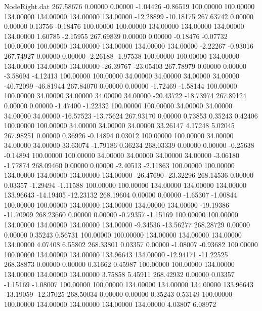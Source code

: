 \begin{filecontents}{NodeRight.dat}
 267.58676    0.00000    0.00000    -1.04426   -0.86519  100.00000  100.00000  134.00000  134.00000  134.00000  134.00000  -12.28899  -10.18175
 267.63742    0.00000    0.00000     0.13756   -0.18476  100.00000  100.00000  134.00000  134.00000  134.00000  134.00000    1.60785   -2.15955
 267.69839    0.00000    0.00000    -0.18476   -0.07732  100.00000  100.00000  134.00000  134.00000  134.00000  134.00000   -2.22267   -0.93016
 267.74927    0.00000    0.00000    -2.26188   -1.97538  100.00000  100.00000  134.00000  134.00000  134.00000  134.00000  -26.39767  -23.05403
 267.78979    0.00000    0.00000    -3.58694   -4.12413  100.00000  100.00000   34.00000   34.00000   34.00000   34.00000  -40.72099  -46.81944
 267.84070    0.00000    0.00000    -1.72469   -1.58144  100.00000  100.00000   34.00000   34.00000   34.00000   34.00000  -20.43722  -18.73974
 267.89124    0.00000    0.00000    -1.47400   -1.22332  100.00000  100.00000   34.00000   34.00000   34.00000   34.00000  -16.57523  -13.75624
 267.93170    0.00000    0.73853     0.35243    0.42406  100.00000  100.00000   34.00000   34.00000   34.00000   33.26147    4.17248    5.02045
 267.98251    0.00000    0.36926    -0.14894    0.03012  100.00000  100.00000   34.00000   34.00000   34.00000   33.63074   -1.79186    0.36234
 268.03339    0.00000    0.00000    -0.25638   -0.14894  100.00000  100.00000   34.00000   34.00000   34.00000   34.00000   -3.06180   -1.77874
 268.09460    0.00000    0.00000    -2.40513   -2.11863  100.00000  100.00000  134.00000  134.00000  134.00000  134.00000  -26.47690  -23.32296
 268.14536    0.00000    0.03357    -1.29494   -1.11588  100.00000  100.00000  134.00000  134.00000  134.00000  133.96643  -14.19405  -12.23132
 268.19604    0.00000    0.00000    -1.65307   -1.00844  100.00000  100.00000  134.00000  134.00000  134.00000  134.00000  -19.19386  -11.70909
 268.23660    0.00000    0.00000    -0.79357   -1.15169  100.00000  100.00000  134.00000  134.00000  134.00000  134.00000   -9.34536  -13.56277
 268.28729    0.00000    0.00000     0.35243    0.56731  100.00000  100.00000  134.00000  134.00000  134.00000  134.00000    4.07408    6.55802
 268.33801    0.03357    0.00000    -1.08007   -0.93682  100.00000  100.00000  134.00000  134.00000  133.96643  134.00000  -12.94171  -11.22525
 268.38873    0.00000    0.00000     0.31662    0.45987  100.00000  100.00000  134.00000  134.00000  134.00000  134.00000    3.75858    5.45911
 268.42932    0.00000    0.03357    -1.15169   -1.08007  100.00000  100.00000  134.00000  134.00000  134.00000  133.96643  -13.19059  -12.37025
 268.50034    0.00000    0.00000     0.35243    0.53149  100.00000  100.00000  134.00000  134.00000  134.00000  134.00000    4.03807    6.08972

\end{filecontents}
